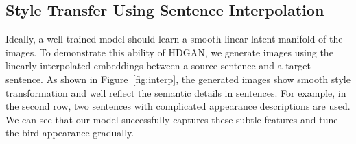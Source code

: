 \documentclass[10pt,twocolumn,letterpaper]{article}
\begin{document}
\subsection{Style Transfer Using Sentence Interpolation}
Ideally, a well trained model should learn a smooth linear latent manifold of the images. To demonstrate this ability of HDGAN, we generate images using the linearly interpolated embeddings between a source sentence and a target sentence. 
As shown in Figure~\ref{fig:interp}, the generated images show smooth style transformation and well reflect the semantic details in sentences. 
For example, in the second row, two sentences with complicated appearance descriptions are used. We can see that our model successfully captures these subtle features and tune the bird appearance gradually. 




\end{document}
